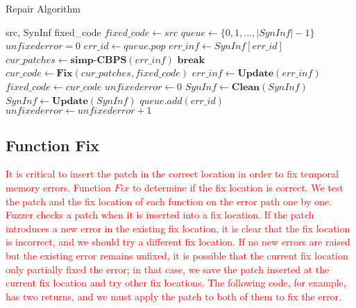 \documentclass[a4paper,11pt,oneside,openany]{book}
\begin{document}
 \begin{algorithm}[t]
 \caption{Repair Algorithm}
 \label{repalgo}
 \begin{algorithmic}[1]
 \renewcommand{\algorithmicrequire}{\textbf{Input:}}
 \renewcommand{\algorithmicensure}{\textbf{Output:}}
 \REQUIRE src, SynInf
 \ENSURE  fixed\_code
  \STATE $fixed\_code \gets src$
  \STATE $queue \gets \{0,1,...,|SynInf|-1\}$
  \STATE $unfixederror = 0$
   \STATE $err\_id \gets queue.pop$
   \STATE $err\_inf \gets SynInf[err\_id]$
   \REPEAT
    \STATE $cur\_patches \gets \textbf{simp-CBPS}(err\_inf)$
     \STATE $\textbf{break}$
    \ENDIF
    \STATE $cur\_code \gets \textbf{Fix}(cur\_patches,fixed\_code)$
     \STATE $err\_inf \gets \textbf{Update}(err\_inf)$
    \ENDIF
    \STATE $fixed\_code \gets cur\_code$
    \STATE $unfixederror \gets 0$
     \STATE $SynInf \gets \textbf{Clean}(SynInf)$
     \STATE $SynInf \gets \textbf{Update}(SynInf)$
    \ENDIF
   \ELSE
    \STATE $queue.add(err\_id)$
    \STATE $unfixederror \gets unfixederror + 1$
   \ENDIF
  \ENDWHILE  
 \end{algorithmic} 
 \end{algorithm}


\subsection{Function Fix}
\textcolor{red}{
It is critical to insert the patch in the correct location in order to fix temporal memory errors. Function $Fix$ to determine if the fix location is correct. We test the patch and the fix location of each function on the error path one by one. Fuzzer checks a patch when it is inserted into a fix location. If the patch introduces a new error in the existing fix location, it is clear that the fix location is incorrect, and we should try a different fix location. If no new errors are raised but the existing error remains unfixed, it is possible that the current fix location only partially fixed the error; in that case, we save the patch inserted at the current fix location and try other fix locations. The following code, for example, has two returns, and we must apply the patch to both of them to fix the error.
}
\end{document}
